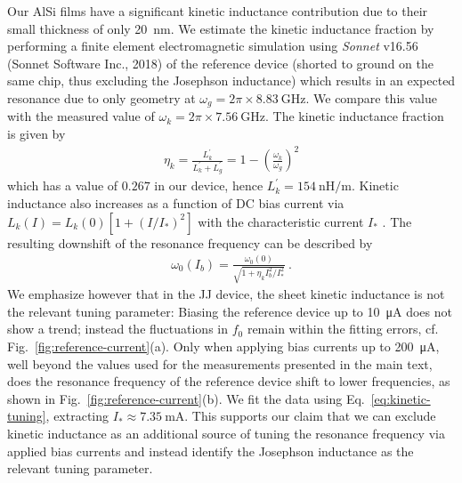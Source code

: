 % 
Our AlSi films have a significant kinetic inductance contribution due to their small thickness of only \SI{20}{nm}.
% 
We estimate the kinetic inductance fraction by performing a finite element electromagnetic simulation using \textit{Sonnet} v16.56 (Sonnet Software Inc., 2018) of the reference device (shorted to ground on the same chip, thus excluding the Josephson inductance) which results in an expected resonance due to only geometry at $\omega_{g}=2\pi\times\SI{8.83}{\giga\hertz}$.
% 
We compare this value with the measured value of $\omega_{k}=2\pi\times\SI{7.56}{\giga\hertz}$.
% 
The kinetic inductance fraction is given by~\cite{gaoExperimentalStudyKinetic2006}
% 
\begin{align}
\eta_k = \frac{L_k^\prime}{L_k^\prime+L_g^\prime}=1-\left(\frac{\omega_k}{\omega_g}\right)^2
\end{align}
% 
which has a value of $0.267$ in our device, hence $L_k^\prime=\SI{154}{\nano\henry\per\meter}$.
% 
Kinetic inductance also increases as a function of DC bias current via $L_k(I)=L_k(0)\left[1+(I/I_*)^2\right]$ with the characteristic current $I_*$ \cite{annunziataTunableSuperconductingNanoinductors2010b}.
% 
The resulting downshift of the resonance frequency can be described by
% 
\begin{align}
\omega_0(I_b) = \frac{\omega_0(0)}{\sqrt{1+\eta_kI_b^2/I_*^{2}}} \ .
\label{eq:kinetic-tuning}
\end{align}
% 
We emphasize however that in the JJ device, the sheet kinetic inductance is not the relevant tuning parameter:
% 
Biasing the reference device up to \SI{10}{\micro\ampere} does not show a trend; instead the fluctuations in $f_0$ remain within the fitting errors, cf.  Fig.~\ref{fig:reference-current}(a).
% 
Only when applying bias currents up to \SI{200}{\micro\ampere}, well beyond the values used for the measurements presented in the main text, does the resonance frequency of the reference device shift to lower frequencies, as shown in Fig.~\ref{fig:reference-current}(b).
% 
We fit the data using Eq.~\eqref{eq:kinetic-tuning}, extracting $I_*\approx\SI{7.35}{\milli\ampere}$.
% 
This supports our claim that we can exclude kinetic inductance as an additional source of tuning the resonance frequency via applied bias currents and instead identify the Josephson inductance as the relevant tuning parameter.


